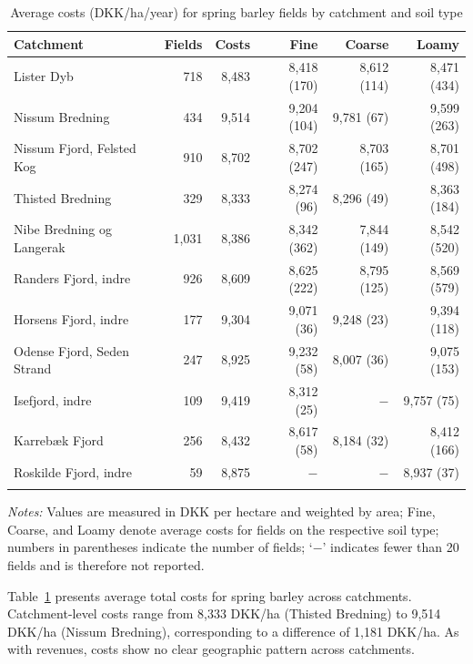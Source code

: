 \documentclass[12pt]{article}
\begin{document}
\begin{table}[H]
\centering
\small
\caption{Average costs (DKK/ha/year) for spring barley fields by catchment and soil type}
\label{tab:costs-vaarbyg}
\begin{threeparttable}
\begin{tabular}{lrrrrr}
\toprule
\textbf{Catchment} & \textbf{Fields} & \textbf{Costs} &
\textbf{Fine} & \textbf{Coarse} & \textbf{Loamy} \\
\midrule\addlinespace
Lister Dyb                 & 718 & 8,483 & 8,418 (170) & 8,612 (114) & 8,471 (434) \\
Nissum Bredning            & 434 & 9,514 & 9,204 (104) & 9,781 (67)  & 9,599 (263) \\
Nissum Fjord, Felsted Kog  & 910 & 8,702 & 8,702 (247) & 8,703 (165) & 8,701 (498) \\
Thisted Bredning           & 329 & 8,333 & 8,274 (96)  & 8,296 (49)  & 8,363 (184) \\
Nibe Bredning og Langerak  & 1,031 & 8,386 & 8,342 (362) & 7,844 (149) & 8,542 (520) \\
Randers Fjord, indre       & 926 & 8,609 & 8,625 (222) & 8,795 (125) & 8,569 (579) \\
Horsens Fjord, indre       & 177 & 9,304 & 9,071 (36)  & 9,248 (23)  & 9,394 (118) \\
Odense Fjord, Seden Strand & 247 & 8,925 & 9,232 (58)  & 8,007 (36)  & 9,075 (153) \\
Isefjord, indre            & 109 & 9,419 & 8,312 (25)  & $-$          & 9,757 (75) \\
Karrebæk Fjord             & 256 & 8,432 & 8,617 (58)  & 8,184 (32)  & 8,412 (166) \\
Roskilde Fjord, indre      & 59  & 8,875 & $-$          & $-$          & 8,937 (37) \\
\addlinespace\bottomrule
\end{tabular}
\begin{tablenotes}
\footnotesize
\item \textit{Notes:} Values are measured in DKK per hectare and weighted by area;
Fine, Coarse, and Loamy denote average costs for fields on the respective soil type;
numbers in parentheses indicate the number of fields; `$-$' indicates fewer than 20 fields and is therefore not reported.
\end{tablenotes}
\end{threeparttable}
\end{table}


Table~\ref{tab:costs-vaarbyg} presents average total costs for spring barley across catchments. 
Catchment-level costs range from 8,333 DKK/ha (Thisted Bredning) to 9,514 DKK/ha (Nissum Bredning), corresponding to a difference of 1,181 DKK/ha. 
As with revenues, costs show no clear geographic pattern across catchments.
\end{document}
